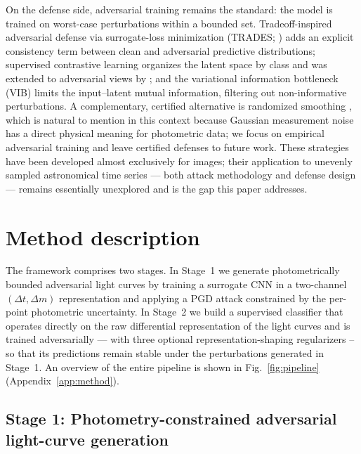 \documentclass{aa}
\begin{document}
On the defense side, adversarial training \citep{madry2017towards}
remains the standard: the model is trained on worst-case perturbations
within a bounded set. Tradeoff-inspired adversarial defense via surrogate-loss minimization (TRADES; \citealt{zhang2019theoretically}) adds an
explicit consistency term between clean and adversarial predictive
distributions; supervised contrastive learning \citep{khosla2020supervised}
organizes the latent space by class and was extended to adversarial views
by \citet{kim2020adversarial}; and the variational information bottleneck (VIB) \citep{alemi2017deep} limits the input--latent mutual information,
filtering out non-informative perturbations. A complementary, certified alternative is randomized smoothing
\citep{cohen2019certified}, which is natural to mention in this context
because Gaussian measurement noise has a direct physical meaning for
photometric data; we focus on empirical adversarial training and leave
certified defenses to future work. These strategies have been
developed almost exclusively for images; their application to unevenly
sampled astronomical time series --- both attack methodology and defense
design --- remains essentially unexplored and is the gap this paper
addresses.

\section{Method description} \label{method}

The framework comprises two stages. In Stage~1 we generate photometrically bounded adversarial light curves by training a surrogate CNN in a two-channel $(\Delta t, \Delta m)$ representation and applying a PGD attack constrained by the per-point photometric uncertainty. In Stage~2 we build a supervised classifier that operates directly on the raw differential representation of the light curves and is trained adversarially --- with three optional representation-shaping regularizers -- so that its predictions remain stable under the perturbations generated in Stage~1. An overview of the entire pipeline is shown in Fig.~\ref{fig:pipeline} (Appendix~\ref{app:method}).



\subsection{Stage 1: Photometry-constrained adversarial light-curve generation} \label{adversarial_section}
\end{document}
